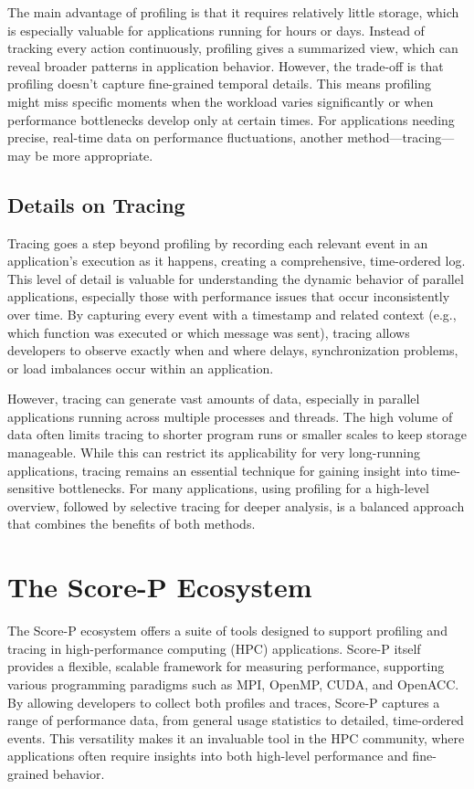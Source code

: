 \documentclass[conference]{IEEEtran}
\begin{document}
The main advantage of profiling is that it requires relatively little storage, which is especially valuable for applications running for hours or days. Instead of tracking every action continuously, profiling gives a summarized view, which can reveal broader patterns in application behavior. However, the trade-off is that profiling doesn’t capture fine-grained temporal details. This means profiling might miss specific moments when the workload varies significantly or when performance bottlenecks develop only at certain times. For applications needing precise, real-time data on performance fluctuations, another method—tracing—may be more appropriate.


\subsection{Details on Tracing}
Tracing goes a step beyond profiling by recording each relevant event in an application’s execution as it happens, creating a comprehensive, time-ordered log. This level of detail is valuable for understanding the dynamic behavior of parallel applications, especially those with performance issues that occur inconsistently over time. By capturing every event with a timestamp and related context (e.g., which function was executed or which message was sent), tracing allows developers to observe exactly when and where delays, synchronization problems, or load imbalances occur within an application.

However, tracing can generate vast amounts of data, especially in parallel applications running across multiple processes and threads. The high volume of data often limits tracing to shorter program runs or smaller scales to keep storage manageable. While this can restrict its applicability for very long-running applications, tracing remains an essential technique for gaining insight into time-sensitive bottlenecks. For many applications, using profiling for a high-level overview, followed by selective tracing for deeper analysis, is a balanced approach that combines the benefits of both methods.



\section*{The Score-P Ecosystem}

The Score-P ecosystem offers a suite of tools designed to support profiling and tracing in high-performance computing (HPC) applications. Score-P itself provides a flexible, scalable framework for measuring performance, supporting various programming paradigms such as MPI, OpenMP, CUDA, and OpenACC. By allowing developers to collect both profiles and traces, Score-P captures a range of performance data, from general usage statistics to detailed, time-ordered events. This versatility makes it an invaluable tool in the HPC community, where applications often require insights into both high-level performance and fine-grained behavior.
\end{document}
